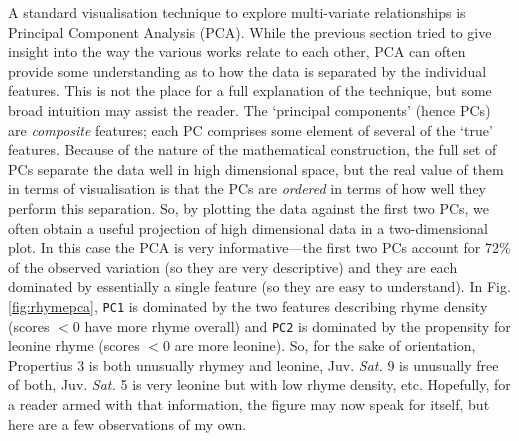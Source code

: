 \documentclass[twocolumn, switch]{article} %
\begin{document}
A standard visualisation technique to explore multi-variate relationships is
Principal Component Analysis (PCA). While the previous section tried to give
insight into the way the various works relate to each other, PCA can often
provide some understanding as to how the data is separated by the individual
features. This is not the place for a full explanation of the technique, but
some broad intuition may assist the reader. The `principal components' (hence
PCs) are \emph{composite} features; each PC comprises some element of several
of the `true' features. Because of the nature of the mathematical
construction, the full set of PCs separate the data well in high dimensional
space, but the real value of them in terms of visualisation is that the PCs
are \emph{ordered} in terms of how well they perform this separation. So, by
plotting the data against the first two PCs, we often obtain a useful
projection of high dimensional data in a two-dimensional plot. In this case
the PCA is very informative---the first two PCs account for 72\% of the
observed variation (so they are very descriptive) and they are each dominated
by essentially a single feature (so they are easy to understand). In Fig.
\ref{fig:rhymepca}, \texttt{PC1} is dominated by the two features describing
rhyme density (scores $<0$ have more rhyme overall) and \texttt{PC2} is
dominated by the propensity for leonine rhyme (scores $<0$ are more leonine).
So, for the sake of orientation, Propertius 3 is both unusually rhymey and
leonine, Juv. \emph{Sat.} 9 is unusually free of both, Juv. \emph{Sat.} 5 is
very leonine but with low rhyme density, etc. Hopefully, for a reader armed
with that information, the figure may now speak for itself, but here are a few
observations of my own.
\end{document}
